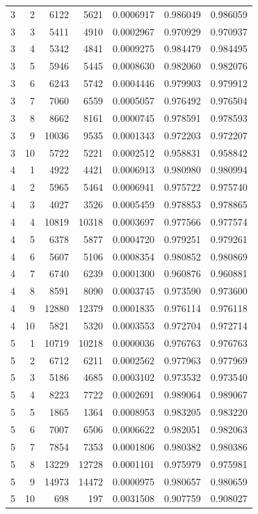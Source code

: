 \begin{longtable}{rrrrrrr}
3 & 2 & 6122 & 5621 & 0.0006917 & 0.986049 & 0.986059\\
3 & 3 & 5411 & 4910 & 0.0002967 & 0.970929 & 0.970937\\
3 & 4 & 5342 & 4841 & 0.0009275 & 0.984479 & 0.984495\\
3 & 5 & 5946 & 5445 & 0.0008630 & 0.982060 & 0.982076\\
3 & 6 & 6243 & 5742 & 0.0004446 & 0.979903 & 0.979912\\
3 & 7 & 7060 & 6559 & 0.0005057 & 0.976492 & 0.976504\\
3 & 8 & 8662 & 8161 & 0.0000745 & 0.978591 & 0.978593\\
3 & 9 & 10036 & 9535 & 0.0001343 & 0.972203 & 0.972207\\
3 & 10 & 5722 & 5221 & 0.0002512 & 0.958831 & 0.958842\\
4 & 1 & 4922 & 4421 & 0.0006913 & 0.980980 & 0.980994\\
4 & 2 & 5965 & 5464 & 0.0006941 & 0.975722 & 0.975740\\
4 & 3 & 4027 & 3526 & 0.0005459 & 0.978853 & 0.978865\\
4 & 4 & 10819 & 10318 & 0.0003697 & 0.977566 & 0.977574\\
4 & 5 & 6378 & 5877 & 0.0004720 & 0.979251 & 0.979261\\
4 & 6 & 5607 & 5106 & 0.0008354 & 0.980852 & 0.980869\\
4 & 7 & 6740 & 6239 & 0.0001300 & 0.960876 & 0.960881\\
4 & 8 & 8591 & 8090 & 0.0003745 & 0.973590 & 0.973600\\
4 & 9 & 12880 & 12379 & 0.0001835 & 0.976114 & 0.976118\\
4 & 10 & 5821 & 5320 & 0.0003553 & 0.972704 & 0.972714\\
5 & 1 & 10719 & 10218 & 0.0000036 & 0.976763 & 0.976763\\
5 & 2 & 6712 & 6211 & 0.0002562 & 0.977963 & 0.977969\\
5 & 3 & 5186 & 4685 & 0.0003102 & 0.973532 & 0.973540\\
5 & 4 & 8223 & 7722 & 0.0002691 & 0.989064 & 0.989067\\
5 & 5 & 1865 & 1364 & 0.0008953 & 0.983205 & 0.983220\\
5 & 6 & 7007 & 6506 & 0.0006622 & 0.982051 & 0.982063\\
5 & 7 & 7854 & 7353 & 0.0001806 & 0.980382 & 0.980386\\
5 & 8 & 13229 & 12728 & 0.0001101 & 0.975979 & 0.975981\\
5 & 9 & 14973 & 14472 & 0.0000975 & 0.980657 & 0.980659\\
5 & 10 & 698 & 197 & 0.0031508 & 0.907759 & 0.908027\\
\end{longtable}

